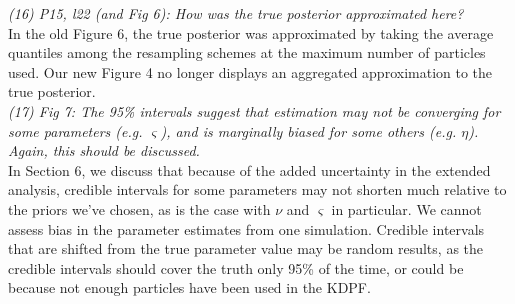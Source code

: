 \documentclass{article}
\newcommand{\danny}[1]{{\color{blue} DANNY: #1}}
\begin{document}
\noindent \emph{(16) P15, l22 (and Fig 6): How was the true posterior approximated here?} \\

In the old Figure 6, the true posterior was approximated by taking the average quantiles among the resampling schemes at the maximum number of particles used. Our new Figure 4 no longer displays an aggregated approximation to the true posterior. \\


\noindent \emph{(17) Fig 7: The 95\% intervals suggest that estimation may not be converging for some parameters (e.g. $\varsigma$), and is marginally biased for some others (e.g. $\eta$). Again, this should be discussed.} \\

In Section 6, we discuss that because of the added uncertainty in the extended analysis, credible intervals for some parameters may not shorten much relative to the priors we've chosen, as is the case with $\nu$ and $\varsigma$ in particular. We cannot assess bias in the parameter estimates from one simulation. Credible intervals that are shifted from the true parameter value may be random results, as the credible intervals should cover the truth only 95\% of the time, or could be because not enough particles have been used in the KDPF. \\

\end{document}
